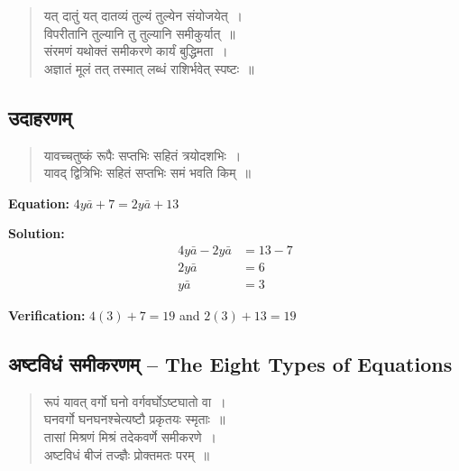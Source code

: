 \documentclass[11pt,a4paper]{article}
\newcommand{\dev}[1]{{\devanagarifont #1}}
\begin{document}
\vspace{0.3cm}

\begin{verse}
\devanagarifont
\centering
\color{versecolor}
\dev{यत् दातुं यत् दातव्यं तुल्यं तुल्येन संयोजयेत्~।}\\
\dev{विपरीतानि तुल्यानि तु तुल्यानि समीकुर्यात्~॥}\\[0.3cm]
\dev{संरमणं यथोक्तं समीकरणे कार्यं बुद्धिमता~।}\\
\dev{अज्ञातं मूलं तत् तस्मात् लब्धं राशिर्भवेत् स्पष्टः~॥}
\end{verse}

\vspace{0.3cm}

\subsection*{\dev{उदाहरणम्}}

\begin{verse}
\devanagarifont
\centering
\color{versecolor}
\dev{यावच्चतुष्कं रूपैः सप्तभिः सहितं त्रयोदशभिः~।}\\
\dev{यावद् द्वित्रिभिः सहितं सप्तभिः समं भवति किम्~॥}
\end{verse}

\textbf{Equation:} $4y\bar{a} + 7 = 2y\bar{a} + 13$

\textbf{Solution:}
\begin{align*}
4y\bar{a} - 2y\bar{a} &= 13 - 7 \\
2y\bar{a} &= 6 \\
y\bar{a} &= 3
\end{align*}

\textbf{Verification:} $4(3) + 7 = 19$ and $2(3) + 13 = 19$ \checkmark

\vspace{0.5cm}

\subsection*{\dev{अष्टविधं समीकरणम् -- The Eight Types of Equations}}

\begin{verse}
\devanagarifont
\centering
\color{versecolor}
\dev{रूपं यावत् वर्गो घनो वर्गवर्घोऽष्टघातो वा~।}\\
\dev{घनवर्गो घनघनश्चेत्यष्टौ प्रकृतयः स्मृताः~॥}\\[0.3cm]
\dev{तासां मिश्रणं मिश्रं तदेकवर्णे समीकरणे~।}\\
\dev{अष्टविधं बीजं तज्ज्ञैः प्रोक्तमतः परम्~॥}
\end{verse}
\end{document}
